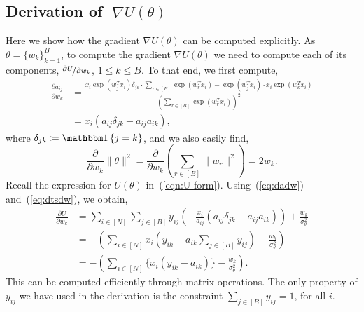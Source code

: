 \subsection{Derivation of {\boldmath $\;\nabla U(\theta)$}}
\label{appdx:gradu}
Here we show how the gradient 
$\nabla U(\theta)$ can be computed explicitly.
As
$\theta = \{ w_k \}_{k=1}^{B}$,
to compute the gradient
$\nabla U(\theta)$ we need to compute
each of its components,
$\nicefrac{\partial U}{\partial w_k}$,
$1\leq k\leq B$.
To that end, we first compute,
%
\begin{align}
	\frac{\partial a_{ij}}{\partial w_k} &= \frac
	{x_i \exp(w_j^T x_i) \delta_{jk} \cdot \sum_{r \in [B]} \exp(w_r^T x_i) 
		- 
		\exp(w_j^T x_i) \cdot x_i \exp(w_k^T x_i)}
	{\left( \sum_{r \in [B]} \exp(w_r^T x_i) \right)^2} \nonumber \\
	&= x_i \left( a_{ij} \delta_{jk} - a_{ij}a_{ik} \right), 
	\label{eq:dadw}
\end{align}
%
where $\delta_{jk} \coloneqq \one \left\{ j = k \right\}$,
and we also easily find,
%
\begin{equation}
	\frac{ \partial}{\partial w_k} \|\theta\|^2 = \frac{\partial}{\partial w_k} \left( \sum_{r \in [B]} \|w_r\|^2 \right) = 2w_k.
	\label{eq:dtsdw}
\end{equation}
%
Recall the expression for $U(\theta)$ in~(\ref{eqn:U-form}). Using~(\ref{eq:dadw}) and~(\ref{eq:dtsdw}), we obtain,
\begin{align}
	\frac{\partial U}{\partial w_k} &= 
	\sum_{i \in [N]} \sum_{j \in [B]} y_{ij} 
	\left( -\frac{x_i}{a_{ij}} \left( a_{ij} \delta_{jk} - a_{ij} a_{ik} \right) \right)
	+ \frac{w_k}{\sigma_\theta^2} \nonumber \\
	&=  - \left( \sum_{i \in [N]} x_i \left( y_{ik} - a_{ik} \sum_{j \in [B]} y_{ij} \right)
	- \frac{w_k}{\sigma_\theta^2} \right) \nonumber \\
	&= - \left( \sum_{i \in [N]} \Big\{ x_i (y_{ik} - a_{ik}) \Big\} - \frac{w_k}{\sigma_\theta^2} \right).
\end{align}
%
This can be computed 
efficiently through matrix operations. The only property of $y_{ij}$ 
we have used in the derivation is the constraint $\sum_{j \in [B]} y_{ij} = 1$,
for all $i$.